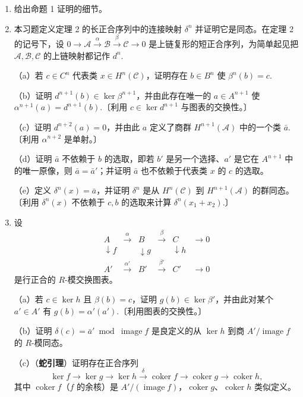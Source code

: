 \begin{enumerate}
\item 给出命题 1 证明的细节。

\item 本习题定义定理 2 的长正合序列中的连接映射 \(\delta^n\) 并证明它是同态。在定理 2 的记号下，设 \(0 \to \mathcal{A} \xrightarrow{\alpha} \mathcal{B} \xrightarrow{\beta} \mathcal{C} \to 0\) 是上链复形的短正合序列，为简单起见把 \(\mathcal{A}, \mathcal{B}, \mathcal{C}\) 的上链映射都记作 \(d^n\).

（a）若 \(c \in C^n\) 代表类 \(x \in H^n(\mathcal{C})\)，证明存在 \(b \in B^n\) 使 \(\beta^n(b) = c\).

（b）证明 \(d^{n+1}(b) \in \ker\beta^{n+1}\)，并由此存在唯一的 \(a \in A^{n+1}\) 使 \(\alpha^{n+1}(a) = d^{n+1}(b)\).〔利用 \(c \in \ker d^{n+1}\) 与图表的交换性。〕

（c）证明 \(d^{n+2}(a) = 0\)，并由此 \(a\) 定义了商群 \(H^{n+1}(\mathcal{A})\) 中的一个类 \(\bar a\).〔利用 \(\alpha^{n+2}\) 是单射。〕

（d）证明 \(\bar a\) 不依赖于 \(b\) 的选取，即若 \(b'\) 是另一个选择、\(a'\) 是它在 \(A^{n+1}\) 中的唯一原像，则 \(\bar a = \bar a'\)；并证明 \(\bar a\) 也不依赖于代表类 \(x\) 的 \(c\) 的选取。

（e）定义 \(\delta^n(x) = \bar a\)，并证明 \(\delta^n\) 是从 \(H^n(\mathcal{C})\) 到 \(H^{n+1}(\mathcal{A})\) 的群同态。〔利用 \(\delta^n(x)\) 不依赖于 \(c, b\) 的选取来计算 \(\delta^n(x_1+x_2)\).〕

\item 设
\[
\begin{array}{cccccc}
A & \xrightarrow{\alpha} & B & \xrightarrow{\beta} & C & \to 0\\
\downarrow f & & \downarrow g & & \downarrow h & \\
A' & \xrightarrow{\alpha'} & B' & \xrightarrow{\beta'} & C' & \to 0
\end{array}
\]
是行正合的 \(R\)-模交换图表。

（a）若 \(c \in \ker h\) 且 \(\beta(b) = c\)，证明 \(g(b) \in \ker\beta'\)，并由此对某个 \(a' \in A'\) 有 \(g(b) = \alpha'(a')\).〔利用图表的交换性。〕

（b）证明 \(\delta(c) = \bar a' \bmod \operatorname{image}f\) 是良定义的从 \(\ker h\) 到商 \(A'/\operatorname{image}f\) 的 \(R\)-模同态。

（c）（\textbf{蛇引理}）证明存在正合序列
\[
\ker f \to \ker g \to \ker h \xrightarrow{\delta} \operatorname{coker}f \to \operatorname{coker}g \to \operatorname{coker}h,
\]
其中 \(\operatorname{coker}f\)（\(f\) 的余核）是 \(A'/(\operatorname{image}f)\)，\(\operatorname{coker}g\)、\(\operatorname{coker}h\) 类似定义。


\end{enumerate}
